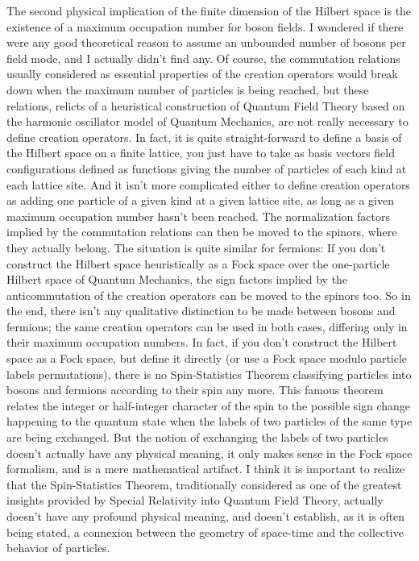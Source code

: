The second physical implication of the finite dimension of the Hilbert space is the existence of a maximum occupation number for boson fields.
I wondered if there were any good theoretical reason to assume an unbounded number of bosons per field mode, and I actually didn't find any.
Of course, the commutation relations usually considered as essential properties of the creation operators would break down when the maximum number of particles is being reached, but these relations, relicts of a heuristical construction of Quantum Field Theory based on the harmonic oscillator model of Quantum Mechanics, are not really necessary to define creation operators.
In fact, it is quite straight-forward to define a basis of the Hilbert space on a finite lattice, you just have to take as basis vectors field configurations defined as functions giving the number of particles of each kind at each lattice site.
And it isn't more complicated either to define creation operators as adding one particle of a given kind at a given lattice site, as long as a given maximum occupation number hasn't been reached.
The normalization factors implied by the commutation relations can then be moved to the spinors, where they actually belong.
The situation is quite similar for fermions: If you don't construct the Hilbert space heuristically as a Fock space over the one-particle Hilbert space of Quantum Mechanics, the sign factors implied by the anticommutation of the creation operators can be moved to the spinors too.
So in the end, there isn't any qualitative distinction to be made between bosons and fermions; the same creation operators can be used in both cases, differing only in their maximum occupation numbers.
In fact, if you don't construct the Hilbert space as a Fock space, but define it directly (or use a Fock space modulo particle labels permutations), there is no Spin-Statistics Theorem classifying particles into bosons and fermions according to their spin any more.
This famous theorem relates the integer or half-integer character of the spin to the possible sign change happening to the quantum state when the labels of two particles of the same type are being exchanged.
But the notion of exchanging the labels of two particles doesn't actually have any physical meaning, it only makes sense in the Fock space formalism, and is a mere mathematical artifact.
I think it is important to realize that the Spin-Statistics Theorem, traditionally considered as one of the greatest insights provided by Special Relativity into Quantum Field Theory, actually doesn't have any profound physical meaning, and doesn't establish, as it is often being stated, a connexion between the geometry of space-time and the collective behavior of particles.
